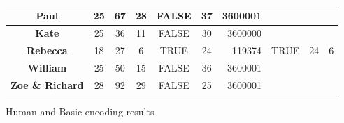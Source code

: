 \documentclass{report}
\theoremstyle{plain}
\begin{document}
\begin{figure}
\begin{tabular}{cc|c|c|c|c|r|c|c|c|}
\multicolumn{1}{|c|}{\textbf{Paul}}                  & 25                & 67               & 28                    & FALSE           & 37                 & 3600001       &                &                  &                       \\ \hline
\multicolumn{1}{|c|}{\textbf{Kate}}                  & 25                & 36               & 11                    & FALSE           & 30                 & 3600000       &                &                  &                       \\ \hline
\multicolumn{1}{|c|}{\textbf{Rebecca}}               & 18                & 27               & 6                     & TRUE            & 24                 & 119374        & TRUE           & 24               & 6                     \\ \hline
\multicolumn{1}{|c|}{\textbf{William}}               & 25                & 50               & 15                    & FALSE           & 36                 & 3600001       &                &                  &                       \\ \hline
\multicolumn{1}{|c|}{\textbf{Zoe \& Richard}}        & 28                & 92               & 29                    & FALSE           & 25                 & 3600001       &                &                  &                       \\ \hline
\end{tabular}
    \caption{Human and Basic encoding results}
    \label{fig:results-1}
\end{figure}
\end{document}

